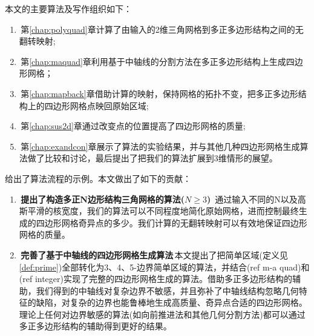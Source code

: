 本文的主要算法及写作组织如下：
\begin{enumerate}
	
\item\,第\ref{chap:polyquad}章计算了由输入的2维三角网格到多正多边形结构之间的无翻转映射;
\item\,第\ref{chap:maquad}章利用基于中轴线的分割方法在多正多边形结构上生成四边形网格；
\item\,第\ref{chap:mapback}章借助计算的映射，保持网格的拓扑不变，把多正多边形结构上的四边形网格点映回原始区域;%
\item\,第\ref{chap:sus2d}章通过改变点的位置提高了四边形网格的质量;
\item\,第\ref{chap:exandcon}章展示了算法的实验结果，并与其他几种四边形网格生成算法做了比较和讨论，最后提出了把我们的算法扩展到3维情形的展望。
\end{enumerate}
给出了算法流程的示例。本文做出了如下的贡献：
\begin{enumerate}
\item\,\textbf{提出了构造多正N边形结构三角网格的算法($N \geq 3$)} \,通过输入不同的N以及高斯平滑的核宽度，我们的算法可以不同程度地简化原始网格，进而控制最终生成的四边形网格奇异点的多少。我们计算的无翻转映射可以有效地保证四边形网格的质量。%

\item\,\textbf{完善了基于中轴线的四边形网格生成算法}\,本文提出了把简单区域(定义见\ref{def:prime})全部转化为3、4、5-边界简单区域的算法，并结合(ref m-a quad)和(ref integer)实现了完整的四边形网格生成的算法。借助多正多边形结构的辅助，我们得到的中轴线对复杂边界不敏感，并且弥补了中轴线结构忽略几何特征的缺陷，对复杂的边界也能鲁棒地生成高质量、奇异点合适的四边形网格。理论上任何对边界敏感的算法(如向前推进法和其他几何分割方法)都可以通过多正多边形结构的辅助得到更好的结果。


\end{enumerate}
